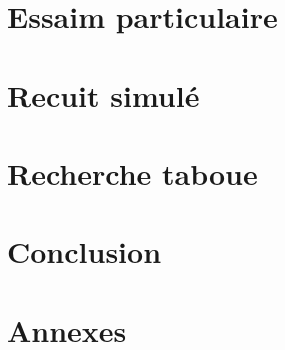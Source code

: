 \documentclass{librairies/lib}
\begin{document}
    


    \newpage

    \section{Essaim particulaire}\label{sec:essaim-particulaire}

    


    \newpage

    \section{Recuit simulé}\label{sec:recuit-simule}

    


    \newpage

    \section{Recherche taboue}\label{sec:recherche-taboue}

    


    \newpage



    \section{Conclusion}\label{sec:conclusion}

    

    \newpage




    \section*{Annexes}





    \printglossaries


    \newpage

    \listoffigures


    \newpage

    \listoftables

    \newpage



    
    
\end{document}
